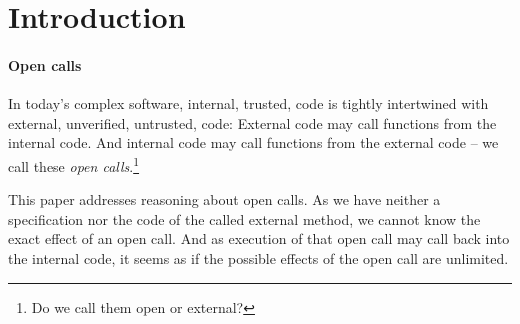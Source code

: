 \section{Introduction}
\label{s:intro}

\paragraph{Open calls} In today's complex software, internal, trusted, code  is tightly intertwined  with external, unverified, untrusted, code:
External code may   call  functions from the internal code.
And internal code  may call  functions from the  external  code -- we call these   \emph{open calls}.\footnote{Do we call them open or external?} 

%
%

This paper addresses reasoning about  open calls.
As we have neither a specification nor the code of  the called external method, we cannot know the exact  effect of an open call.
And as execution of that open call may call back into the internal code, it seems as if the possible effects of the open call are unlimited.
 
\vspace{.1cm}

